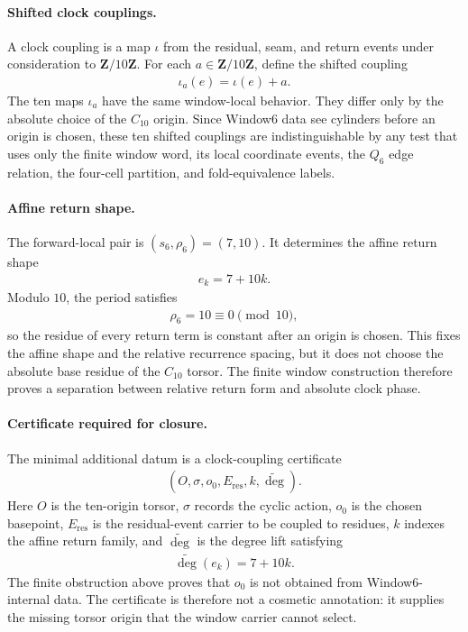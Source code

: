 \paragraph{Shifted clock couplings.}
A clock coupling is a map $\iota$ from the residual, seam, and return events under consideration to $\mathbf{Z}/10\mathbf{Z}$. For each $a\in \mathbf{Z}/10\mathbf{Z}$, define the shifted coupling
$$
\begin{aligned}
\iota_a(e)=\iota(e)+a.
\end{aligned}
$$
The ten maps $\iota_a$ have the same window-local behavior. They differ only by the absolute choice of the $C_{10}$ origin. Since Window6 data see cylinders before an origin is chosen, these ten shifted couplings are indistinguishable by any test that uses only the finite window word, its local coordinate events, the $Q_6$ edge relation, the four-cell partition, and fold-equivalence labels.

\paragraph{Affine return shape.}
The forward-local pair is $(s_6,\rho_6)=(7,10)$. It determines the affine return shape
$$
\begin{aligned}
e_k=7+10k.
\end{aligned}
$$
Modulo $10$, the period satisfies
$$
\begin{aligned}
\rho_6=10\equiv 0\pmod {10},
\end{aligned}
$$
so the residue of every return term is constant after an origin is chosen. This fixes the affine shape and the relative recurrence spacing, but it does not choose the absolute base residue of the $C_{10}$ torsor. The finite window construction therefore proves a separation between relative return form and absolute clock phase.

\paragraph{Certificate required for closure.}
The minimal additional datum is a clock-coupling certificate
$$
\begin{aligned}
(O,\sigma,o_0,E_{\mathrm{res}},k,\widetilde{\deg}).
\end{aligned}
$$
Here $O$ is the ten-origin torsor, $\sigma$ records the cyclic action, $o_0$ is the chosen basepoint, $E_{\mathrm{res}}$ is the residual-event carrier to be coupled to residues, $k$ indexes the affine return family, and $\widetilde{\deg}$ is the degree lift satisfying
$$
\begin{aligned}
\widetilde{\deg}(e_k)=7+10k.
\end{aligned}
$$
The finite obstruction above proves that $o_0$ is not obtained from Window6-internal data. The certificate is therefore not a cosmetic annotation: it supplies the missing torsor origin that the window carrier cannot select.

